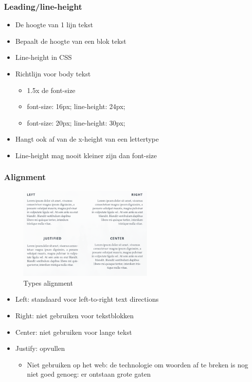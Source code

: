 \documentclass{article}
\begin{document}
\subsubsection{Leading/line-height}
\begin{itemize}
    \item De hoogte van 1 lijn tekst
    \item Bepaalt de hoogte van een blok tekst
    \item Line-height in CSS
    \item Richtlijn voor body tekst
    \begin{itemize}
        \item 1.5x de font-size
        \item font-size: 16px; line-height: 24px;
        \item font-size: 20px; line-height: 30px;
    \end{itemize}
    \item Hangt ook af van de x-height van een lettertype
    \item Line-height mag nooit kleiner zijn dan font-size
\end{itemize}

\subsubsection{Alignment}

\begin{figure}[H]
    \centering
    \includegraphics[width=0.6\textwidth]{img/Screenshot_20200224_092057.png}
    \caption{Types alignment}
\end{figure}

\begin{itemize}
    \item Left: standaard voor left-to-right text directions
    \item Right: niet gebruiken voor tekstblokken
    \item Center: niet gebruiken voor lange tekst
    \item Justify: opvullen
    \begin{itemize}
        \item Niet gebruiken op het web: de technologie om woorden af te breken is nog niet goed genoeg: er ontstaan grote gaten
    \end{itemize}
\end{itemize}
\end{document}
